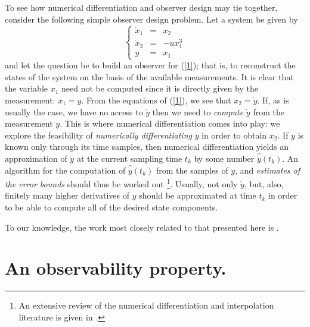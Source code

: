 To see how numerical differentiation and observer design may tie together, 
consider the 
following simple observer design problem.
Let a system be given by
\begin{equation}
\left\{
\begin{array}{rcl}
\dot x_1 & = & x_2\\
\dot x_2 & = & -ux_1^3\\
y & = & x_1\end{array}
\right. \label{1}
\end{equation}
and let the question be to build an observer for (\ref{1}); that is,
to reconstruct the states of the system on the basis of the available
measurements.
It is clear that the variable $x_1$ need not be computed since it 
is directly given by the measurement: $ x_1 = y$.
From the equations of (\ref{1}), we see that $x_2 = \dot y$.
If, as is usually the case, we have no access to 
$\dot y$ then we need to {\it compute} $\dot y$ from the measurement $y$.
This is where numerical differentiation comes into play:
we explore the feasibility of {\it numerically
differentiating} $y$ in order to obtain $x_2$.
If $y$ is known only through its time samples, then numerical 
differentiation yields an approximation of
$\dot y$ at the current sampling time $t_k$ by some number
$\hat {\dot y}(t_k)$.
An algorithm for the computation of $\hat {\dot y}(t_k)$ from the
samples of $y$, and {\it estimates of the error bounds} should thus be worked
out \footnote{An extensive review of the numerical differentiation and
interpolation
literature is given in \cite{UMTechReport93}.}.
Usually, not only $\dot y$, but, also, finitely many higher
derivatives of $y$ should be approximated at time $t_k$ in order to be
able to compute all of the desired state components.

To our knowledge, the work most closely related to that presented here
is \cite{Sch73}.

\section{An observability property.}\setcounter{equation}{0}
\label{observability}

